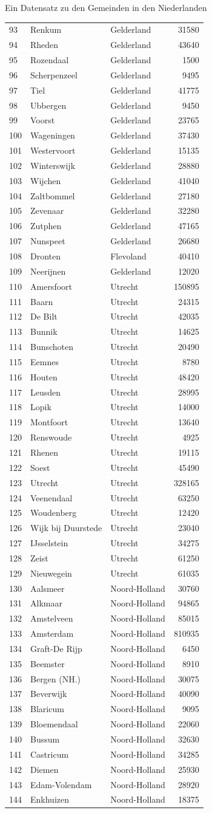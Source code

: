 \documentclass[ignorenonframetext,]{beamer}
\begin{document}
\begin{frame}[fragile]{Ein Datensatz zu den Gemeinden in den
Niederlanden}
\begin{longtable}[]{@{}lllr@{}}
93 & Renkum & Gelderland & 31580\tabularnewline
94 & Rheden & Gelderland & 43640\tabularnewline
95 & Rozendaal & Gelderland & 1500\tabularnewline
96 & Scherpenzeel & Gelderland & 9495\tabularnewline
97 & Tiel & Gelderland & 41775\tabularnewline
98 & Ubbergen & Gelderland & 9450\tabularnewline
99 & Voorst & Gelderland & 23765\tabularnewline
100 & Wageningen & Gelderland & 37430\tabularnewline
101 & Westervoort & Gelderland & 15135\tabularnewline
102 & Winterswijk & Gelderland & 28880\tabularnewline
103 & Wijchen & Gelderland & 41040\tabularnewline
104 & Zaltbommel & Gelderland & 27180\tabularnewline
105 & Zevenaar & Gelderland & 32280\tabularnewline
106 & Zutphen & Gelderland & 47165\tabularnewline
107 & Nunspeet & Gelderland & 26680\tabularnewline
108 & Dronten & Flevoland & 40410\tabularnewline
109 & Neerijnen & Gelderland & 12020\tabularnewline
110 & Amersfoort & Utrecht & 150895\tabularnewline
111 & Baarn & Utrecht & 24315\tabularnewline
112 & De Bilt & Utrecht & 42035\tabularnewline
113 & Bunnik & Utrecht & 14625\tabularnewline
114 & Bunschoten & Utrecht & 20490\tabularnewline
115 & Eemnes & Utrecht & 8780\tabularnewline
116 & Houten & Utrecht & 48420\tabularnewline
117 & Leusden & Utrecht & 28995\tabularnewline
118 & Lopik & Utrecht & 14000\tabularnewline
119 & Montfoort & Utrecht & 13640\tabularnewline
120 & Renswoude & Utrecht & 4925\tabularnewline
121 & Rhenen & Utrecht & 19115\tabularnewline
122 & Soest & Utrecht & 45490\tabularnewline
123 & Utrecht & Utrecht & 328165\tabularnewline
124 & Veenendaal & Utrecht & 63250\tabularnewline
125 & Woudenberg & Utrecht & 12420\tabularnewline
126 & Wijk bij Duurstede & Utrecht & 23040\tabularnewline
127 & IJsselstein & Utrecht & 34275\tabularnewline
128 & Zeist & Utrecht & 61250\tabularnewline
129 & Nieuwegein & Utrecht & 61035\tabularnewline
130 & Aalsmeer & Noord-Holland & 30760\tabularnewline
131 & Alkmaar & Noord-Holland & 94865\tabularnewline
132 & Amstelveen & Noord-Holland & 85015\tabularnewline
133 & Amsterdam & Noord-Holland & 810935\tabularnewline
134 & Graft-De Rijp & Noord-Holland & 6450\tabularnewline
135 & Beemster & Noord-Holland & 8910\tabularnewline
136 & Bergen (NH.) & Noord-Holland & 30075\tabularnewline
137 & Beverwijk & Noord-Holland & 40090\tabularnewline
138 & Blaricum & Noord-Holland & 9095\tabularnewline
139 & Bloemendaal & Noord-Holland & 22060\tabularnewline
140 & Bussum & Noord-Holland & 32630\tabularnewline
141 & Castricum & Noord-Holland & 34285\tabularnewline
142 & Diemen & Noord-Holland & 25930\tabularnewline
143 & Edam-Volendam & Noord-Holland & 28920\tabularnewline
144 & Enkhuizen & Noord-Holland & 18375\tabularnewline

\end{longtable}
\end{frame}
\end{document}
